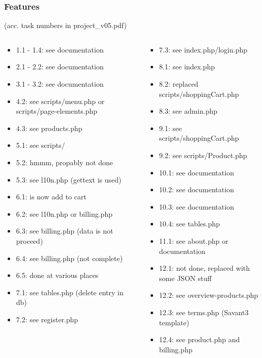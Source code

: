 \begin{frame}
\frametitle{Features}
%
(acc. task numbers in project\_v05.pdf)
%
\begin{columns}[c]
\column{2.3in}
%
\begin{scriptsize}
\begin{itemize}
  \item 1.1 - 1.4: see documentation
  \item 2.1 - 2.2: see documentation
  \item 3.1 - 3.2: see documentation
  \item 4.2: see scripts/menu.php or scripts/page-elements.php
  \item 4.3: see products.php
  \item 5.1: see scripts/
  \item 5.2: hmmm, propably not done
  \item 5.3: see l10n.php (gettext is used)
  \item 6.1: is now add to cart
  \item 6.2: see l10n.php or billing.php
  \item 6.3: see billing.php (data is not proceed)
  \item 6.4: see billing.php (not complete)
  \item 6.5: done at various places
  \item 7.1: see tables.php (delete entry in db)
  \item 7.2: see register.php

\end{itemize}
\end{scriptsize}

\column{2.3in}
%
\begin{scriptsize}
\begin{itemize}
  \item 7.3: see index.php/login.php
  \item 8.1: see index.php
  \item 8.2: replaced scripts/shoppingCart.php
  \item 8.3: see admin.php 
  \item 9.1: see scripts/shoppingCart.php
  \item 9.2: see scripts/Product.php
  \item 10.1: see documentation
  \item 10.2: see documentation
  \item 10.3: see documentation
  \item 10.4: see tables.php
  \item 11.1: see about.php or documentation
  \item 12.1: not done, replaced with some JSON stuff
  \item 12.2: see overview-products.php
  \item 12.3: see terms.php (Savant3 template)
  \item 12.4: see product.php and billing.php
\end{itemize}
\end{scriptsize}
%
\end{columns}
%
\end{frame}

